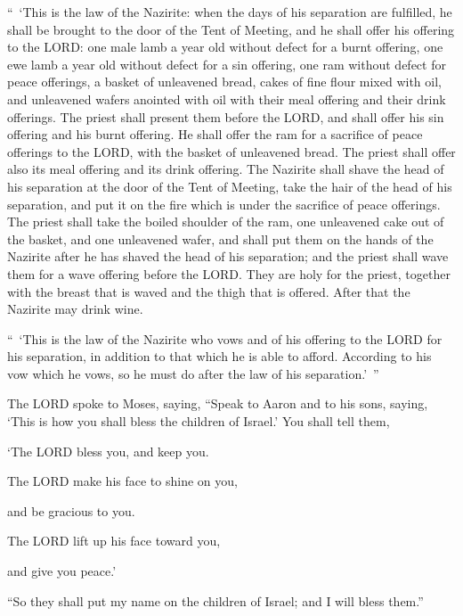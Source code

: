 \myverse{}“ ‘This is the law of the Nazirite: when the days of his separation
are fulfilled, he shall be brought to the door of the Tent of Meeting,
\myverse{}and he shall offer his offering to the LORD: one male lamb a year old without
defect for a burnt offering, one ewe lamb a year old without defect for a sin offering, one ram without
defect for peace offerings,
\myverse{}a basket of unleavened bread, cakes of fine flour mixed with oil, and unleavened
wafers anointed with oil with their meal offering and their drink offerings.
\myverse{}The priest shall present them before the LORD, and shall offer his sin offering
and his burnt offering.
\myverse{}He shall offer the ram for a sacrifice of peace offerings to the LORD, with
the basket of unleavened bread. The priest shall offer also its meal offering and its drink offering.
\myverse{}The Nazirite shall shave the head of his separation at the door of the Tent
of Meeting, take the hair of the head of his separation, and put it on the fire which is under the sacrifice
of peace offerings.
\myverse{}The priest shall take the boiled shoulder of the ram, one unleavened cake
out of the basket, and one unleavened wafer, and shall put them on the hands of the Nazirite after he
has shaved the head of his separation;
\myverse{}and the priest shall wave them for a wave offering before the LORD. They are
holy for the priest, together with the breast that is waved and the thigh that is offered. After that
the Nazirite may drink wine.


\myverse{}“ ‘This is the law of the Nazirite who vows and of his offering
to the LORD for his separation, in addition to that which he is able to afford. According to his vow which
he vows, so he must do after the law of his separation.’ ”


\myverse{}The LORD spoke to Moses, saying,
\myverse{}“Speak to Aaron and to his sons, saying, ‘This is how you shall bless the
children of Israel.’ You shall tell them,


\myverse{}‘The LORD bless you, and keep you.


\myverse{}The LORD make his face to shine on you,

and be gracious to you.


\myverse{}The LORD lift up his face toward you,

and give you peace.’


\myverse{}“So they shall put my name on the children of Israel; and I will
bless them.”


